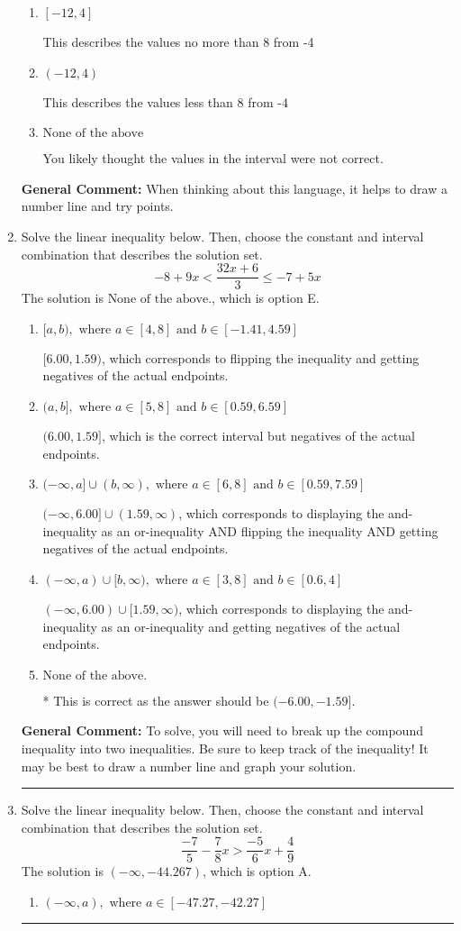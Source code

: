 \documentclass{extbook}[14pt]
\newcommand{\litem}[1]{\item #1

\rule{\textwidth}{0.4pt}}
\begin{document}
\begin{enumerate}
{\begin{enumerate}[label=\Alph*.]
This describes the values no less than 8 from -4
\item \( [-12, 4] \)

This describes the values no more than 8 from -4
\item \( (-12, 4) \)

This describes the values less than 8 from -4
\item \( \text{None of the above} \)

You likely thought the values in the interval were not correct.
\end{enumerate}

\textbf{General Comment:} When thinking about this language, it helps to draw a number line and try points.
}
\litem{
Solve the linear inequality below. Then, choose the constant and interval combination that describes the solution set.
\[ -8 + 9 x < \frac{32 x + 6}{3} \leq -7 + 5 x \]
The solution is \( \text{None of the above.} \), which is option E.\begin{enumerate}[label=\Alph*.]
\item \( [a, b), \text{ where } a \in [4, 8] \text{ and } b \in [-1.41, 4.59] \)

$[6.00, 1.59)$, which corresponds to flipping the inequality and getting negatives of the actual endpoints.
\item \( (a, b], \text{ where } a \in [5, 8] \text{ and } b \in [0.59, 6.59] \)

$(6.00, 1.59]$, which is the correct interval but negatives of the actual endpoints.
\item \( (-\infty, a] \cup (b, \infty), \text{ where } a \in [6, 8] \text{ and } b \in [0.59, 7.59] \)

$(-\infty, 6.00] \cup (1.59, \infty)$, which corresponds to displaying the and-inequality as an or-inequality AND flipping the inequality AND getting negatives of the actual endpoints.
\item \( (-\infty, a) \cup [b, \infty), \text{ where } a \in [3, 8] \text{ and } b \in [0.6, 4] \)

$(-\infty, 6.00) \cup [1.59, \infty)$, which corresponds to displaying the and-inequality as an or-inequality and getting negatives of the actual endpoints.
\item \( \text{None of the above.} \)

* This is correct as the answer should be $(-6.00, -1.59]$.
\end{enumerate}

\textbf{General Comment:} To solve, you will need to break up the compound inequality into two inequalities. Be sure to keep track of the inequality! It may be best to draw a number line and graph your solution.
}
\litem{
Solve the linear inequality below. Then, choose the constant and interval combination that describes the solution set.
\[ \frac{-7}{5} - \frac{7}{8} x > \frac{-5}{6} x + \frac{4}{9} \]
The solution is \( (-\infty, -44.267) \), which is option A.\begin{enumerate}[label=\Alph*.]
\item \( (-\infty, a), \text{ where } a \in [-47.27, -42.27] \)


\end{enumerate}}
\end{enumerate}
\end{document}
